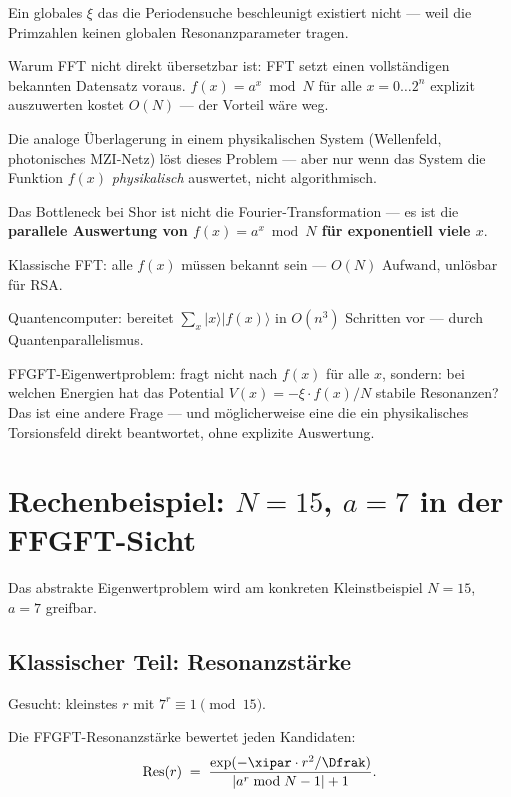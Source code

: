 Ein globales $\xi$ das die Periodensuche beschleunigt
existiert nicht --- weil die Primzahlen keinen
globalen Resonanzparameter tragen.

Warum FFT nicht direkt übersetzbar ist:
FFT setzt einen vollständigen bekannten Datensatz voraus.
$f(x) = a^x \bmod N$ für alle $x = 0 \ldots 2^n$
explizit auszuwerten kostet $O(N)$ --- der Vorteil wäre weg.

Die analoge Überlagerung in einem physikalischen System
(Wellenfeld, photonisches MZI-Netz) löst dieses Problem ---
aber nur wenn das System die Funktion $f(x)$
\emph{physikalisch} auswertet, nicht algorithmisch.

\begin{important}
Das Bottleneck bei Shor ist nicht die
Fourier-Transformation --- es ist die
\textbf{parallele Auswertung von $f(x) = a^x \bmod N$
für exponentiell viele $x$}.

Klassische FFT: alle $f(x)$ müssen bekannt sein
--- $O(N)$ Aufwand, unlösbar für RSA.

Quantencomputer: bereitet $\sum_x |x\rangle|f(x)\rangle$
in $O(n^3)$ Schritten vor --- durch Quantenparallelismus.

FFGFT-Eigenwertproblem: fragt nicht nach $f(x)$ für alle $x$,
sondern: bei welchen Energien hat das Potential
$V(x) = -\xi \cdot f(x)/N$ stabile Resonanzen?
Das ist eine andere Frage --- und möglicherweise
eine die ein physikalisches Torsionsfeld
direkt beantwortet, ohne explizite Auswertung.
\end{important}

\section{Rechenbeispiel: \texorpdfstring{$N=15$, $a=7$}{N=15, a=7} in der FFGFT-Sicht}
\label{sec:beispiel-n15}

Das abstrakte Eigenwertproblem wird am konkreten
Kleinstbeispiel $N = 15$, $a = 7$ greifbar.

\subsection{Klassischer Teil: Resonanzstärke}

Gesucht: kleinstes $r$ mit $7^r \equiv 1 \pmod{15}$.

Die FFGFT-Resonanzstärke bewertet jeden Kandidaten:
\begin{equation}
  \text{Res}(r) \;=\;
  \frac{\exp(-\xipar \cdot r^2 / \Dfrak)}
       {|a^r \bmod N - 1| + 1}.
\end{equation}

